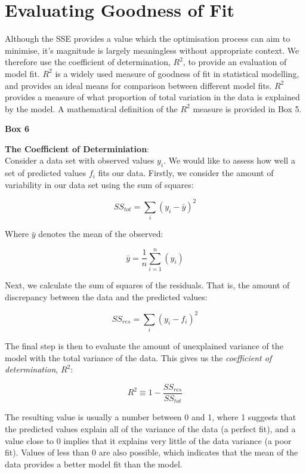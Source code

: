 \section{Evaluating Goodness of Fit}
Although the SSE provides a value which the optimisation process can
aim to minimise, it's magnitude is largely meaningless without
appropriate context. We therefore use the coefficient of
determination, $R^2$, to provide an evaluation of model fit. $R^2$ is
a widely used measure of goodness of fit in statistical modelling, and
provides an ideal means for comparison between different model
fits. $R^2$ provides a measure of what proportion of total variation
in the data is explained by the model. A mathematical definition of
the $R^2$ measure is provided in Box 5.

\newpage
\begin{framed}
{\begin{center}{\bf Box 6}\end{center}}
{\bf The Coefficient of Determiniation}:\\

Consider a data set with observed values $y_i$. We would like to assess how
well a set of predicted values $f_i$ fits our data. Firstly, we
consider the amount of variability in our data set using the sum of
squares:

\begin{equation}
  SS_{tot} = \sum\limits_{i}(y_i - \bar{y})^2
\end{equation}

Where $\bar{y}$ denotes the mean of the observed:

\begin{equation}
  \bar{y} = \frac{1}{n}\sum\limits_{i=1}^n(y_i)
\end{equation}

Next, we calculate the sum of squares of the residuals. That is, the
amount of discrepancy between the data and the predicted values:

\begin{equation}
SS_{res} = \sum\limits_{i}(y_i - f_i)^2
\end{equation}

The final step is then to evaluate the amount of unexplained variance of
the model with the total variance of the data. This gives us the
\emph{coefficient of determination}, $R^2$:

\begin{equation}
  R^2 \equiv 1 - \frac{SS_{res}}{SS_{tot}}
\end{equation}

The resulting value is usually a number between 0 and 1, where 1
suggests that the predicted values explain all of the variance of the
data (a perfect fit), and a value close to 0 implies that it explains
very little of the data
variance (a poor fit). Values of less than 0 are also possible, which indicates
that the mean of the data provides a better model fit than the model.

\end{framed}

